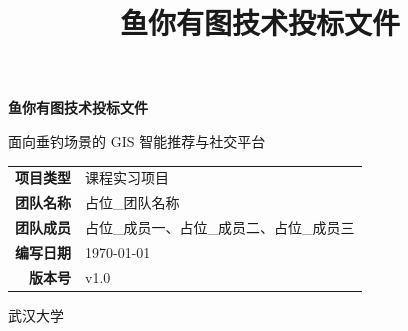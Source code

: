 \documentclass[12pt,a4paper]{ctexart}
\title{\Huge\bfseries 鱼你有图技术投标文件}
\author{}
\date{}
\begin{document}
\begin{titlepage}
  \centering
  \vspace*{3cm}

  {\Huge\bfseries 鱼你有图技术投标文件\par}
  \vspace{0.8cm}
  {\LARGE 面向垂钓场景的 GIS 智能推荐与社交平台\par}

  \vspace{2.5cm}

  \begin{tabular}{rl}
    \textbf{项目类型} & 课程实习项目 \\[6pt]
    \textbf{团队名称} & \quad 占位\_团队名称 \\[6pt]
    \textbf{团队成员} & \quad 占位\_成员一、占位\_成员二、占位\_成员三 \\[6pt]
    \textbf{编写日期} & \quad \today \\[6pt]
    \textbf{版本号}   & \quad v1.0 \\
  \end{tabular}

  \vspace{2cm}
  {\large 武汉大学}
\end{titlepage}

\tableofcontents
\newpage


\newpage

\newpage

\newpage

\newpage

\newpage

\newpage

\newpage

\newpage

\newpage

\newpage

\newpage

\newpage

\newpage

\newpage

\newpage

\newpage

\newpage

\newpage

\end{document}
